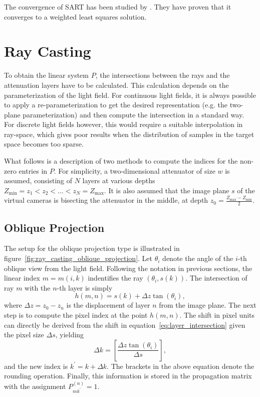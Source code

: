 The convergence of \mbox{SART} has been studied by \cite{ConvergenceSART2}.
They have proven that it converges to a weighted least squares solution.

\section{Ray Casting}
\label{sec:ray_casting}

To obtain the linear system $P$, the intersections between the rays and the attenuation layers have to be calculated.
This calculation depends on the parameterization of the light field.
For continuous light fields, it is always possible to apply a re-parameterization to get the desired representation (e.g. the two-plane parameterization) and then compute the intersection in a standard way.
For discrete light fields however, this would require a suitable interpolation in ray-space, which gives poor results when the distribution of samples in the target space becomes too sparse.

What follows is a description of two methods to compute the indices for the non-zero entries in $P$. 
For simplicity, a two-dimensional attenuator of size $w$ is assumed, consisting of $N$ layers at various depths 
$Z_{\text{min}} = z_1 < z_2 < \dots < z_N = Z_{\text{max}}$.
It is also assumed that the image plane $s$ of the virtual cameras is bisecting the attenuator in the middle, at depth 
$z_0 = \frac{Z_{\text{max}} - Z_{\text{min}}}{2}$.

\subsection*{Oblique Projection}

The setup for the oblique projection type is illustrated in figure~\ref{fig:ray_casting_oblique_projection}.
Let $\theta_i$ denote the angle of the \mbox{$i$-th} oblique view from the light field.
Following the notation in previous sections, the linear index $m = m(i, k)$ indentifies the ray $(\theta_i, s(k))$.
The intersection of ray $m$ with the \mbox{$n$-th} layer is simply
\begin{equation}\label{eq:layer_intersection}
	h(m, n) = s(k) + \Delta z \tan (\theta_i), 
\end{equation}
where $\Delta z = z_0 - z_n$ is the displacement of layer $n$ from the image plane.
The next step is to compute the pixel index at the point $h(m, n)$.
The shift in pixel units can directly be derived from the shift in equation~\ref{eq:layer_intersection} given the pixel size $\Delta s$, yielding
\begin{equation}
	\Delta k = \left[ \frac{\Delta z \tan (\theta_i)}{\Delta s} \right],
\end{equation}
and the new index is $k^\prime = k + \Delta k$.
The brackets in the above equation denote the rounding operation.
Finally, this information is stored in the propagation matrix with the assignment $P_{m k^\prime}^{(n)} = 1$.

